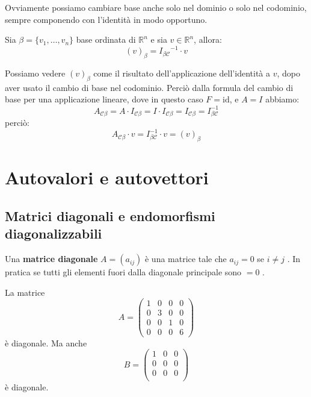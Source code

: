\documentclass[
  a4paper,
]{article}
\begin{document}
Ovviamente possiamo cambiare base anche solo nel dominio o solo nel
codominio, sempre componendo con l'identità in modo opportuno.

\begin{propositionbox}[Corollario]
Sia \(\beta = \{v_1, \dots, v_n\}\) base ordinata di \(\mathbb{R}^n\) e
sia \(v \in \mathbb{R}^n\), allora: \[
(v)_\beta ={I_{\beta\mathcal{C}}}^{-1} \cdot v
\]
\end{propositionbox}

\begin{proofbox}
Possiamo vedere \((v)_{\beta}\) come il risultato dell'applicazione
dell'identità a \(v\), dopo aver usato il cambio di base nel codominio.
Perciò dalla formula del cambio di base per una applicazione lineare,
dove in questo caso \(F = \text{id}\), e \(A = I\) abbiamo: \[
A_{\mathcal{C}\beta} = A \cdot I_{\mathcal{C}\beta} = I \cdot I_{\mathcal{C}\beta} = I_{\mathcal{C}\beta} = I^{-1}_{\beta \mathcal{C}}
\] perciò: \[
A_{\mathcal{C}\beta} \cdot v = I^{-1}_{\beta \mathcal{C}} \cdot v = (v)_{\beta}
\]
\end{proofbox}

\newpage

\hypertarget{autovalori-e-autovettori}{%
\section{Autovalori e autovettori}\label{autovalori-e-autovettori}}

\hypertarget{matrici-diagonali-e-endomorfismi-diagonalizzabili}{%
\subsection{Matrici diagonali e endomorfismi
diagonalizzabili}\label{matrici-diagonali-e-endomorfismi-diagonalizzabili}}

\begin{definitionbox}
Una \textbf{matrice diagonale} \(A = (a_{ij})\) è una matrice tale che
\(a_{ij} = 0\) se \(i \not = j\) . In pratica se tutti gli elementi
fuori dalla diagonale principale sono \(= 0\) .
\end{definitionbox}

\begin{examplebox}
La matrice \[
A=
\begin{pmatrix}
1 & 0 & 0 & 0\\
0 & 3 & 0 & 0\\
0 & 0 & 1 & 0\\
0 & 0 & 0 & 6
\end{pmatrix}
\] è diagonale. Ma anche \[
B=
\begin{pmatrix}
1 & 0 & 0 \\
0 & 0 & 0 \\
0 & 0 & 0 \\
\end{pmatrix}
\] è diagonale.
\end{examplebox}
\end{document}
